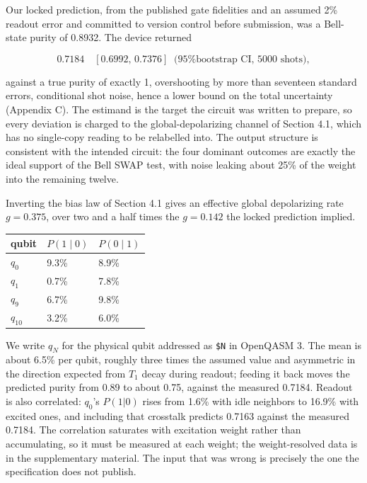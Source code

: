 Our locked prediction, from the published gate fidelities and an assumed
2\% readout error and committed to version control before submission, was
a Bell-state purity of 0.8932. The device returned

\[0.7184 \quad [0.6992,\, 0.7376] \;\; \text{(95\% bootstrap CI, 5000 shots)},\]

against a true purity of exactly 1, overshooting by more than seventeen
standard errors, conditional shot noise, hence a lower bound on the
total uncertainty (Appendix C). The estimand is the target the circuit was
written to prepare, so every deviation is charged to the
global-depolarizing channel of Section 4.1, which has no single-copy
reading to be relabelled into. The output structure is consistent with the
intended circuit: the four dominant outcomes are exactly the ideal support
of the Bell SWAP test, with noise leaking about 25\% of the weight into
the remaining twelve.

Inverting the bias law of Section 4.1 gives an effective global
depolarizing rate \(g = 0.375\), over two and a half times the
\(g = 0.142\) the locked prediction implied.

\begin{table}[htbp]
\centering
\setlength{\tabcolsep}{10pt}
\begin{tabular}{@{}lll@{}}
\toprule
qubit & \(P(1 \mid 0)\) & \(P(0 \mid 1)\) \\
\midrule
\(q_0\) & 9.3\% & 8.9\% \\
\(q_1\) & 0.7\% & 7.8\% \\
\(q_9\) & 6.7\% & 9.8\% \\
\(q_{10}\) & 3.2\% & 6.0\% \\
\bottomrule
\end{tabular}
\end{table}

We write \(q_N\) for the physical qubit addressed as \texttt{\$N} in
OpenQASM 3. The mean is about 6.5\% per qubit, roughly three times the
assumed value and asymmetric in the direction expected from \(T_1\) decay
during readout; feeding it back moves the predicted purity from 0.89 to
about 0.75, against the measured 0.7184. Readout is also correlated:
\(q_0\)'s \(P(1|0)\) rises from 1.6\% with idle neighbors to 16.9\% with
excited ones, and including that crosstalk predicts 0.7163 against the
measured 0.7184. The correlation saturates with excitation weight rather
than accumulating, so it must be measured at each weight; the
weight-resolved data is in the supplementary material. The input that was
wrong is precisely the one the specification does not publish.


